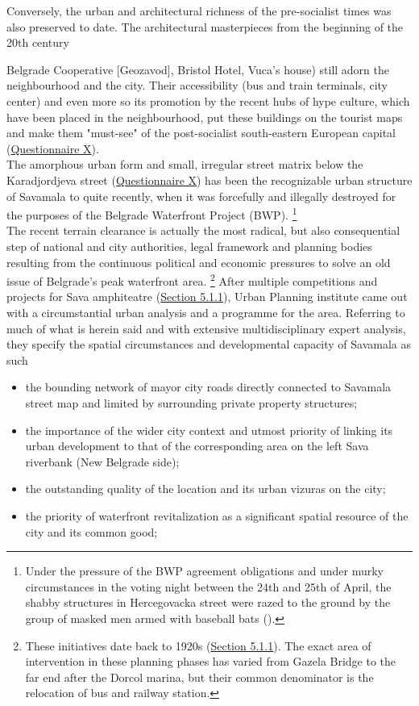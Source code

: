 \documentclass[11pt]{report}
\begin{document}
Conversely, the urban and architectural richness of the pre-socialist times was also preserved to date.
The architectural masterpieces from the beginning of the 20th century {Belgrade Cooperative [Geozavod], Bristol Hotel, Vuca's house) still adorn the neighbourhood and the city.
Their accessibility (bus and train terminals, city center) and even more so its promotion by the recent hubs of hype culture, which have been placed in the neighbourhood, put these buildings on the tourist maps and make them "must-see" of the post-socialist south-eastern European capital (\href{Questionnaire Experts Savamala}{Questionnaire X}).
\\

The amorphous urban form and small, irregular street matrix below the Karadjordjeva street (\href{Questionnaire PhD students}{Questionnaire X}) has been the recognizable urban structure of Savamala to quite recently, when it was forcefully and illegally destroyed for the purposes of the Belgrade Waterfront Project (BWP).
\footnote{Under the pressure of the BWP agreement obligations and under murky circumstances in the voting night between the 24th and 25th of April, the shabby structures in Hercegovacka street were razed to the ground by the group of masked men armed with baseball bats (\citealt{popovic_porusili_2016}).} %
\\

The recent terrain clearance is actually the most radical, but also consequential step of national and city authorities, legal framework and planning bodies resulting from the continuous political and economic pressures to solve an old issue of Belgrade’s peak waterfront area.
\footnote{These initiatives date back to 1920s (\href{Section 5.1.1}{Section 5.1.1}).
The exact area of intervention in these planning phases has varied from Gazela Bridge to the far end after the Dorcol marina, but their common denominator is the relocation of bus and railway station.}
After multiple competitions and projects for Sava amphiteatre (\href{Section 5.1.1}{Section 5.1.1}), Urban Planning institute came out with a circumstantial urban analysis and a programme for the area.
Referring to much of what is herein said and with extensive multidisciplinary expert analysis, they specify the spatial circumstances and developmental capacity of Savamala as such 

\begin{itemize}
\item the bounding network of mayor city roads directly connected to Savamala street map and limited by surrounding private property structures;
\item the importance of the wider city context and utmost priority of linking its urban development to that of the corresponding area on the left Sava riverbank (New Belgrade side);
\item the outstanding quality of the location and its urban vizuras on the city;
\item the priority of waterfront revitalization as a significant spatial resource of the city and its common good;
\end{itemize}

}
\end{document}
